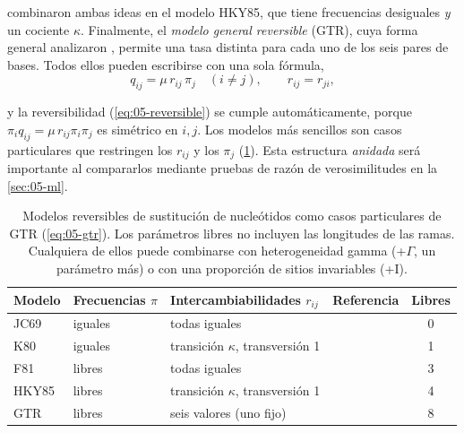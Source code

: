 \textcite{c05-hasegawa1985} combinaron ambas ideas en el modelo HKY85, que tiene frecuencias desiguales \emph{y} un cociente $\kappa$. Finalmente, el \emph{modelo general reversible} (GTR), cuya forma general analizaron \textcite{c05-rodriguez1990}, permite una tasa distinta para cada uno de los seis pares de bases. Todos ellos pueden escribirse con una sola fórmula,
\begin{equation}\label{eq:05-gtr}
q_{ij} = \mu\, r_{ij}\,\pi_j \quad (i\ne j),\qquad r_{ij}=r_{ji},
\end{equation}

\begin{simbolos}
\end{simbolos}

\noindent y la reversibilidad (\cref{eq:05-reversible}) se cumple automáticamente, porque $\pi_i q_{ij}=\mu\,r_{ij}\pi_i\pi_j$ es simétrico en $i,j$. Los modelos más sencillos son casos particulares que restringen los $r_{ij}$ y los $\pi_j$ (\cref{tab:05-modelos-adn}). Esta estructura \emph{anidada} será importante al compararlos mediante pruebas de razón de verosimilitudes en la \cref{sec:05-ml}.

\begin{table}[t]
\centering
\caption[Modelos de sustitución de nucleótidos]{Modelos reversibles de sustitución de nucleótidos como casos particulares de GTR (\cref{eq:05-gtr}). Los parámetros libres no incluyen las longitudes de las ramas. Cualquiera de ellos puede combinarse con heterogeneidad gamma (+$\Gamma$, un parámetro más) o con una proporción de sitios invariables (+I).}
\label{tab:05-modelos-adn}
\small
\begin{tabular}{@{}llllc@{}}
\toprule
\textbf{Modelo} & \textbf{Frecuencias} $\pi$ & \textbf{Intercambiabilidades} $r_{ij}$ & \textbf{Referencia} & \textbf{Libres}\\
\midrule
JC69  & iguales   & todas iguales                     & \textcite{c05-jukes1969} & 0\\
K80   & iguales   & transición $\kappa$, transversión 1 & \textcite{c05-kimura1980} & 1\\
F81   & libres    & todas iguales                     & \textcite{c05-felsenstein1981} & 3\\
HKY85 & libres    & transición $\kappa$, transversión 1 & \textcite{c05-hasegawa1985} & 4\\
GTR   & libres    & seis valores (uno fijo)           & \textcite{c05-rodriguez1990} & 8\\
\bottomrule
\end{tabular}
\end{table}

